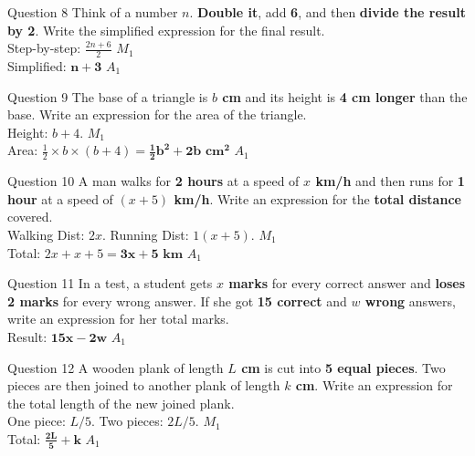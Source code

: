 \documentclass[12pt, a4paper, oneside]{article}
\begin{document}
\begin{solvingbox}{Question 8}
Think of a number $n$. \textbf{Double it}, add \textbf{6}, and then \textbf{divide the result by 2}. Write the simplified expression for the final result. \\
Step-by-step: $\frac{2n + 6}{2}$ \hfill $M_1$ \\
Simplified: $\mathbf{n + 3}$ \hfill $A_1$
\end{solvingbox}

\begin{solvingbox}{Question 9}
The base of a triangle is \textbf{$b$ cm} and its height is \textbf{4 cm longer} than the base. Write an expression for the area of the triangle. \\
Height: $b + 4$. \hfill $M_1$ \\
Area: $\frac{1}{2} \times b \times (b + 4) = \mathbf{\frac{1}{2}b^2 + 2b\text{ cm}^2}$ \hfill $A_1$
\end{solvingbox}

\begin{solvingbox}{Question 10}
A man walks for \textbf{2 hours} at a speed of \textbf{$x$ km/h} and then runs for \textbf{1 hour} at a speed of \textbf{$(x + 5)$ km/h}. Write an expression for the \textbf{total distance} covered. \\
Walking Dist: $2x$. Running Dist: $1(x + 5)$. \hfill $M_1$ \\
Total: $2x + x + 5 = \mathbf{3x + 5\text{ km}}$ \hfill $A_1$
\end{solvingbox}

\begin{solvingbox}{Question 11}
In a test, a student gets \textbf{$x$ marks} for every correct answer and \textbf{loses 2 marks} for every wrong answer. If she got \textbf{15 correct} and \textbf{$w$ wrong} answers, write an expression for her total marks. \\
Result: $\mathbf{15x - 2w}$ \hfill $A_1$
\end{solvingbox}

\begin{solvingbox}{Question 12}
A wooden plank of length \textbf{$L$ cm} is cut into \textbf{5 equal pieces}. Two pieces are then joined to another plank of length \textbf{$k$ cm}. Write an expression for the total length of the new joined plank. \\
One piece: $L/5$. Two pieces: $2L/5$. \hfill $M_1$ \\
Total: $\mathbf{\frac{2L}{5} + k}$ \hfill $A_1$
\end{solvingbox}
\end{document}
